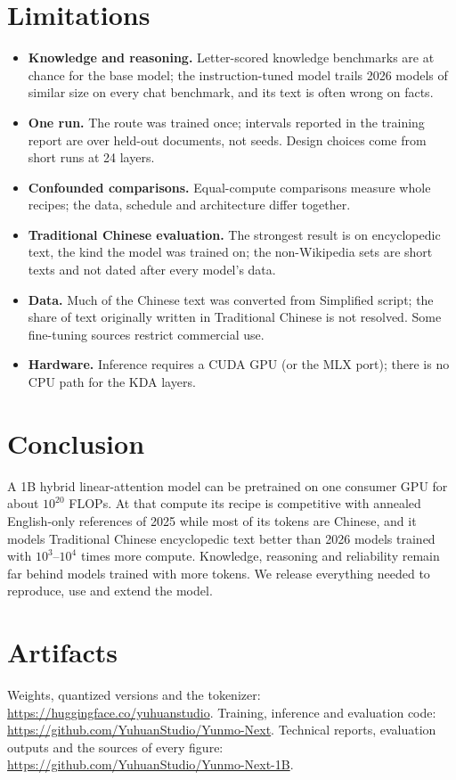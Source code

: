 \documentclass[11pt]{article}
\begin{document}
\section{Limitations}

\begin{itemize}
\item \textbf{Knowledge and reasoning.} Letter-scored knowledge benchmarks are at chance for the base model; the
  instruction-tuned model trails 2026 models of similar size on every chat benchmark, and its text is often wrong
  on facts.
\item \textbf{One run.} The route was trained once; intervals reported in the training report are over held-out
  documents, not seeds. Design choices come from short runs at 24 layers.
\item \textbf{Confounded comparisons.} Equal-compute comparisons measure whole recipes; the data, schedule and
  architecture differ together.
\item \textbf{Traditional Chinese evaluation.} The strongest result is on encyclopedic text, the kind the model
  was trained on; the non-Wikipedia sets are short texts and not dated after every model's data.
\item \textbf{Data.} Much of the Chinese text was converted from Simplified script; the share of text originally
  written in Traditional Chinese is not resolved. Some fine-tuning sources restrict commercial use.
\item \textbf{Hardware.} Inference requires a CUDA GPU (or the MLX port); there is no CPU path for the KDA layers.
\end{itemize}

\section{Conclusion}

A 1B hybrid linear-attention model can be pretrained on one consumer GPU for about $10^{20}$ FLOPs. At that
compute its recipe is competitive with annealed English-only references of 2025 while most of its tokens are
Chinese, and it models Traditional Chinese encyclopedic text better than 2026 models trained with
$10^3$--$10^4$ times more compute. Knowledge, reasoning and reliability remain far behind models trained with
more tokens. We release everything needed to reproduce, use and extend the model.

\section*{Artifacts}

Weights, quantized versions and the tokenizer: \url{https://huggingface.co/yuhuanstudio}.
Training, inference and evaluation code: \url{https://github.com/YuhuanStudio/Yunmo-Next}.
Technical reports, evaluation outputs and the sources of every figure: \url{https://github.com/YuhuanStudio/Yunmo-Next-1B}.



\end{document}
